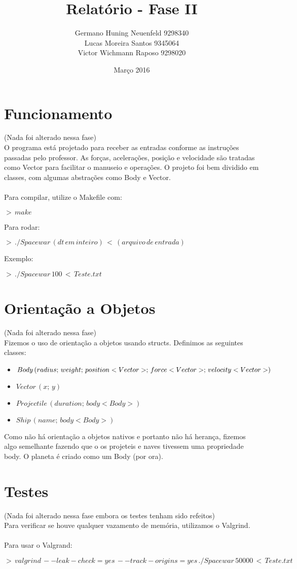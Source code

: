 \documentclass{article}
\title{Relatório - Fase II}
\author{
    Germano Huning Neuenfeld 9298340
    \\
    Lucas Moreira Santos 9345064
    \\
    Victor Wichmann Raposo 9298020
}
\date{Março 2016}
\begin{document}
\maketitle

\section{Funcionamento}
(Nada foi alterado nessa fase) \\
O programa está projetado para receber as entradas conforme as instruções passadas pelo professor.
As forças, acelerações, posição e velocidade são tratadas como Vector para facilitar o manuseio e operações.
O projeto foi bem dividido em classes, com algumas abstrações como Body e Vector. \\ \\
Para compilar, utilize o Makefile com:
\begin{center}
$>\,make$
\end{center}
Para rodar:
\begin{center}
$>\, ./Spacewar\,(dt\,em\,inteiro)\,<\,(arquivo\,de\,entrada)$
\end{center}
\quad Exemplo:
\begin{center}
$>\,./Spacewar\,100\,<\,Teste.txt$
\end{center}

\section{Orientação a Objetos}
(Nada foi alterado nessa fase) \\
Fizemos o uso de orientação a objetos usando structs. Definimos as seguintes classes:
    \begin{itemize}
    \item $Body\,(radius;\,weight;\,position<Vector>;\,force<Vector>;\,velocity\\<Vector>)$
    \item $Vector\,(x;\,y)$
    \item $Projectile\,(duration;\,body<Body>)$
    \item $Ship\,(name;\,body<Body>)$
    \end{itemize}
Como não há orientação a objetos nativos e portanto não há herança, fizemos algo semelhante
fazendo que o os projeteis e naves tivessem uma propriedade body. O planeta é criado como um Body (por ora).

\section{Testes}
(Nada foi alterado nessa fase embora os testes tenham sido refeitos) \\
Para verificar se houve qualquer vazamento de memória, utilizamos o Valgrind.\\ \\ 
Para usar o Valgrand:
\begin{center}
$>\,valgrind\,--leak-check=yes\,--track-origins=yes\,./Spacewar\,50000\,<\,Teste.txt$
\end{center}
\end{document}
